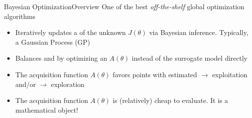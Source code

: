 \documentclass{beamer}
\begin{document}
\begin{frame}
  \titlepage
\end{frame}


\begin{frame}{Bayesian Optimization}{Overview}
One of the best \emph{off-the-shelf} global optimization algorithms%
\begin{itemize}
 \item Iteratively updates a  of the unknown $J(\theta)$ via Bayesian inference. Typically, a Gaussian Process (GP)
 \item Balances  and  by optimizing an 
  $A(\theta)$ instead of the surrogate model directly
 \item The acquisition function $A(\theta)$ favors points with estimated  
 $\rightarrow$ exploitation and/or  $\rightarrow$ exploration
 \item The acquisition function $A(\theta)$ is (relatively) cheap to evaluate. It is a mathematical object!
\end{itemize}
\pause
\end{frame}
\end{document}
